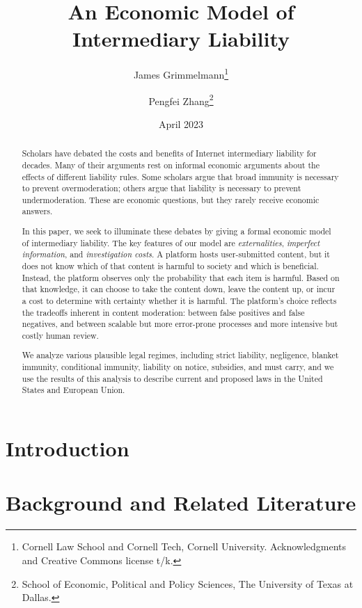 \documentclass[openbib,12pt]{article}  %
\title{An Economic Model of Intermediary Liability}
\author{James Grimmelmann\footnote{Cornell Law School and Cornell Tech, Cornell University. Acknowledgments and Creative Commons license t/k. }
\and Pengfei Zhang\footnote{School of Economic, Political and Policy Sciences, The University of Texas at Dallas.}}
\date{April 2023}
\begin{document}
\maketitle

\begin{abstract}
\noindent 
Scholars have debated the costs and benefits of Internet intermediary liability for decades. Many of their arguments rest on informal economic arguments about the effects of different liability rules. Some scholars argue that broad immunity is necessary to prevent overmoderation; others argue that liability is necessary to prevent undermoderation. These are economic questions, but they rarely receive economic answers.

In this paper, we seek to illuminate these debates by giving a formal economic model of intermediary liability. The key features of our model are \emph{externalities}, \emph{imperfect information}, and \emph{investigation costs}. A platform hosts user-submitted content, but it does not know which of that content is harmful to society and which is beneficial. Instead, the platform observes only the probability that each item is harmful. Based on that knowledge, it can choose to take the content down, leave the content up, or incur a cost to determine with certainty whether it is harmful. The platform's choice reflects the tradeoffs inherent in content moderation: between false positives and false negatives, and between scalable but more error-prone processes and more intensive but costly human review.

We analyze various plausible legal regimes, including strict liability, negligence, blanket immunity, conditional immunity, liability on notice, subsidies, and must carry, and we use the results of this analysis to describe current and proposed laws in the United States and European Union.

\vspace{0in}

\end{abstract}

\newpage
\tableofcontents

\newpage

\section*{Introduction}\label{EMIL_Section:intro}


\section{Background and Related Literature}\label{EMIL_Section:inst}





\end{document}
